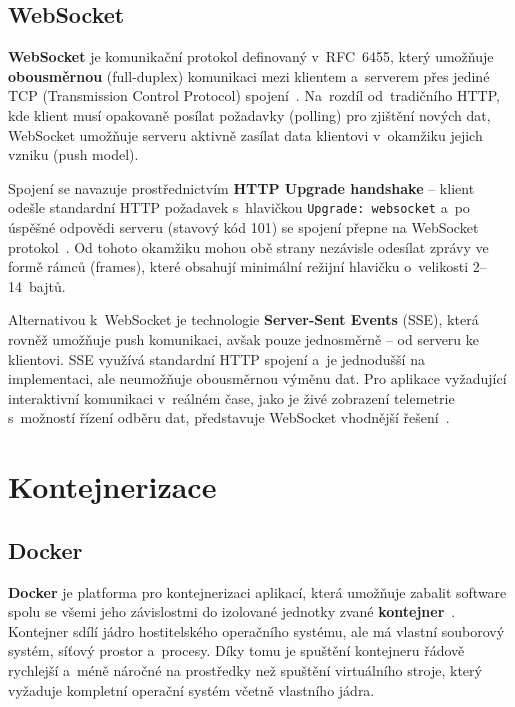 \subsection{WebSocket}

\begin{sloppypar}
\textbf{WebSocket} je komunikační protokol definovaný v~RFC~6455, který umožňuje \textbf{obousměrnou} (full-duplex) komunikaci mezi klientem a~serverem přes jediné TCP (Transmission Control Protocol) spojení~\cite{rfc6455websocket}. Na~rozdíl od~tradičního HTTP, kde klient musí opakovaně posílat požadavky (polling) pro zjištění nových dat, WebSocket umožňuje serveru aktivně zasílat data klientovi v~okamžiku jejich vzniku (push model).
\end{sloppypar}

Spojení se navazuje prostřednictvím \textbf{HTTP Upgrade handshake} -- klient odešle standardní HTTP požadavek s~hlavičkou \texttt{Upgrade: websocket} a~po úspěšné odpovědi serveru (stavový kód 101) se spojení přepne na WebSocket protokol~\cite{rfc6455websocket}. Od tohoto okamžiku mohou obě strany nezávisle odesílat zprávy ve formě rámců (frames), které obsahují minimální režijní hlavičku o~velikosti 2--14~bajtů.

Alternativou k~WebSocket je technologie \textbf{Server-Sent Events} (SSE), která rovněž umožňuje push komunikaci, avšak pouze jednosměrně -- od serveru ke klientovi. SSE využívá standardní HTTP spojení a~je jednodušší na implementaci, ale neumožňuje obousměrnou výměnu dat. Pro aplikace vyžadující interaktivní komunikaci v~reálném čase, jako je živé zobrazení telemetrie s~možností řízení odběru dat, představuje WebSocket vhodnější řešení~\cite{murley2021websocket}.

\section{Kontejnerizace}

\subsection{Docker}

\textbf{Docker} je platforma pro kontejnerizaci aplikací, která umožňuje zabalit software spolu se všemi jeho závislostmi do izolované jednotky zvané \textbf{kontejner}~\cite{sipek2018docker}. Kontejner sdílí jádro hostitelského operačního systému, ale má vlastní souborový systém, síťový prostor a~procesy. Díky tomu je spuštění kontejneru řádově rychlejší a~méně náročné na prostředky než spuštění virtuálního stroje, který vyžaduje kompletní operační systém včetně vlastního jádra.

